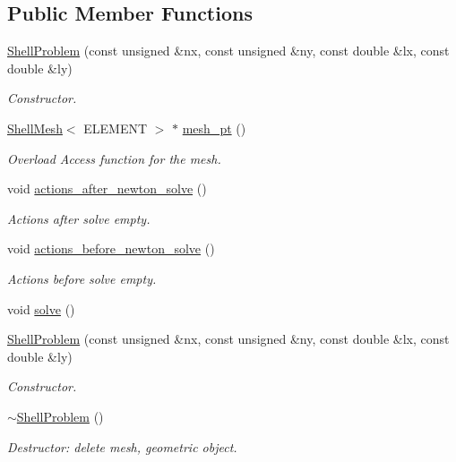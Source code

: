 \subsection*{Public Member Functions}
\begin{DoxyCompactItemize}
\item 
\hyperlink{classShellProblem_a1ec644498c95acea00cc05c5bd30d075}{Shell\+Problem} (const unsigned \&nx, const unsigned \&ny, const double \&lx, const double \&ly)
\begin{DoxyCompactList}\small\item\em Constructor. \end{DoxyCompactList}\item 
\hyperlink{classShellMesh}{Shell\+Mesh}$<$ E\+L\+E\+M\+E\+NT $>$ $\ast$ \hyperlink{classShellProblem_a1905a1b913469ed54f7c8f55d133ff57}{mesh\+\_\+pt} ()
\begin{DoxyCompactList}\small\item\em Overload Access function for the mesh. \end{DoxyCompactList}\item 
void \hyperlink{classShellProblem_a65636b791c99203ecbb09ba2a2eec214}{actions\+\_\+after\+\_\+newton\+\_\+solve} ()
\begin{DoxyCompactList}\small\item\em Actions after solve empty. \end{DoxyCompactList}\item 
void \hyperlink{classShellProblem_a379156a43ce05fe0e2dcf8a986a2ac64}{actions\+\_\+before\+\_\+newton\+\_\+solve} ()
\begin{DoxyCompactList}\small\item\em Actions before solve empty. \end{DoxyCompactList}\item 
void \hyperlink{classShellProblem_aa6d150bd1c137edbf4ded27ed044766d}{solve} ()
\item 
\hyperlink{classShellProblem_a1ec644498c95acea00cc05c5bd30d075}{Shell\+Problem} (const unsigned \&nx, const unsigned \&ny, const double \&lx, const double \&ly)
\begin{DoxyCompactList}\small\item\em Constructor. \end{DoxyCompactList}\item 
\hyperlink{classShellProblem_afb893165e8a3695d416f852bff5b3280}{$\sim$\+Shell\+Problem} ()
\begin{DoxyCompactList}\small\item\em Destructor\+: delete mesh, geometric object. \end{DoxyCompactList}\item 

\end{DoxyCompactItemize}
